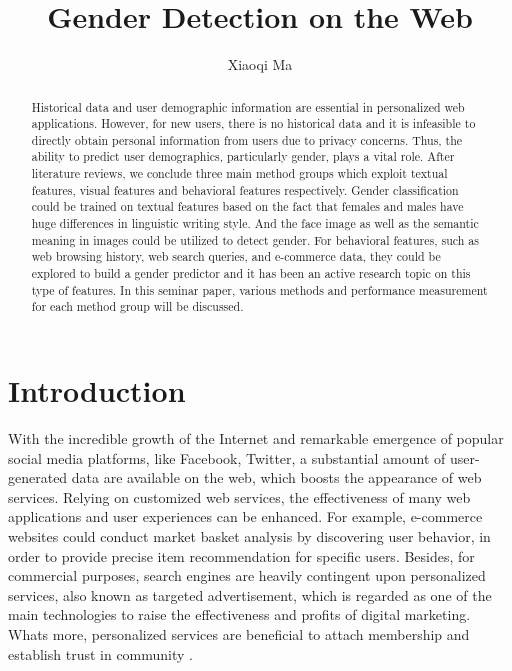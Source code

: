 \documentclass[runningheads]{llncs}
\begin{document}
	
	\title{Gender Detection on the Web}
	\author{Xiaoqi Ma}
	\maketitle  
	
	\begin{abstract}
		
		Historical data and user demographic information are essential in personalized web applications. However, for new users, there is no historical data and it is infeasible to directly obtain personal information from users due to privacy concerns. Thus, the ability to predict user demographics, particularly gender, plays a vital role. After literature reviews, we conclude three main method groups which exploit textual features, visual features and behavioral features respectively. Gender classification could be trained on textual features based on the fact that females and males have huge differences in linguistic writing style. And the face image as well as the semantic meaning in images could be utilized to detect gender. For behavioral features, such as web browsing history, web search queries, and e-commerce data, they could be explored to build a gender predictor and it has been an active research topic on this type of features. In this seminar paper, various methods and performance measurement for each method group will be discussed.
		
	\end{abstract}
	
	\section{Introduction}
	
	With the incredible growth of the Internet and remarkable emergence of popular social media platforms, like Facebook, Twitter, a substantial amount of user-generated data are available on the web, which boosts the appearance of web services. Relying on customized web services, the effectiveness of many web applications and user experiences can be enhanced. For example, e-commerce websites could conduct market basket analysis by discovering user behavior, in order to provide precise item recommendation for specific users. Besides, for commercial purposes, search engines are heavily contingent upon personalized services, also known as targeted advertisement, which is regarded as one of the main technologies to raise the effectiveness and profits of digital marketing. What\textquotesingle s more, personalized services are beneficial to attach membership and establish trust in community \cite{zhong2015you}.\\
	
\end{document}
